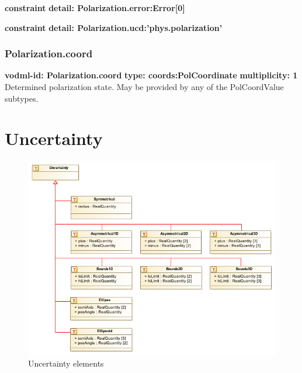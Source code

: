     \noindent \textbf{constraint} \newline
    \indent    \textbf{detail: Polarization.error:Error[0] }\newline

    \noindent \textbf{constraint} \newline
    \indent    \textbf{detail: Polarization.ucd:'phys.polarization' }\newline

    \subsubsection{Polarization.coord}
      \textbf{vodml-id: Polarization.coord} \newline
      \textbf{type: coords:PolCoordinate} \newline
      \textbf{multiplicity: 1} \newline 
      Determined polarization state. May be provided by any of the PolCoordValue subtypes.

\pagebreak
\section{Uncertainty}

  \begin{figure}[h]
  \begin{center}
    \includegraphics[width=5in]{diagrams/Uncertainty.png}
    \caption{Uncertainty elements}\label{fig:uncertainty}
  \end{center}
  \end{figure}

